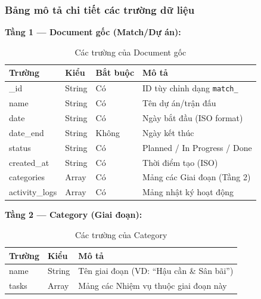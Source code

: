 \documentclass[a4paper,12pt]{article}
\begin{document}
\subsubsection{Bảng mô tả chi tiết các trường dữ liệu}

\textbf{Tầng 1 --- Document gốc (Match/Dự án):}
\begin{table}[H]
\centering
\begin{tabular}{|l|l|l|p{5.5cm}|}
\hline
\textbf{Trường} & \textbf{Kiểu} & \textbf{Bắt buộc} & \textbf{Mô tả} \\ \hline
\_id & String & Có & ID tùy chỉnh dạng \texttt{match\_<uuid8>} \\ \hline
name & String & Có & Tên dự án/trận đấu \\ \hline
date & String & Có & Ngày bắt đầu (ISO format) \\ \hline
date\_end & String & Không & Ngày kết thúc \\ \hline
status & String & Có & Planned / In Progress / Done \\ \hline
created\_at & String & Có & Thời điểm tạo (ISO) \\ \hline
categories & Array & Có & Mảng các Giai đoạn (Tầng 2) \\ \hline
activity\_logs & Array & Có & Mảng nhật ký hoạt động \\ \hline
\end{tabular}
\caption{Các trường của Document gốc}
\end{table}

\textbf{Tầng 2 --- Category (Giai đoạn):}
\begin{table}[H]
\centering
\begin{tabular}{|l|l|p{7cm}|}
\hline
\textbf{Trường} & \textbf{Kiểu} & \textbf{Mô tả} \\ \hline
name & String & Tên giai đoạn (VD: ``Hậu cần \& Sân bãi'') \\ \hline
tasks & Array & Mảng các Nhiệm vụ thuộc giai đoạn này \\ \hline
\end{tabular}
\caption{Các trường của Category}
\end{table}
\end{document}
